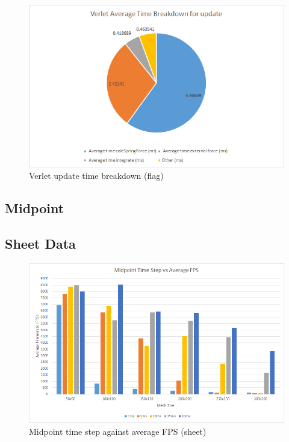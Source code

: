     \begin{figure}
    \begin{center}
      \includegraphics[scale=.9]{Figures/flag_v_ut}
    \end{center}
    \caption{Verlet update time breakdown (flag)}
    \label{fig:v ut flag}
  \end{figure}

\begin{landscape}
\section{Midpoint}

\subsection{Sheet Data}

  \begin{figure}[!htb]
    \begin{center}
      \includegraphics{Figures/sheet_m_fps}
    \end{center}
    \caption{Midpoint time step against average FPS (sheet)}
    \label{fig:m fps sheet}
  \end{figure}
\end{landscape}
  
